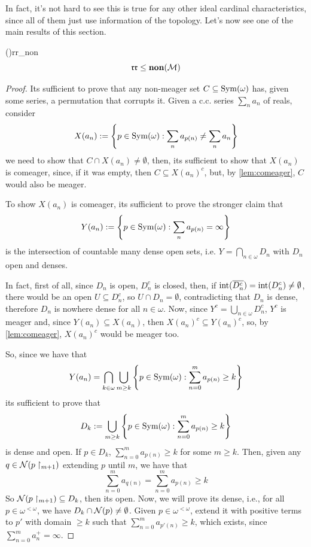 In fact, it's not hard to see this is true for any other ideal cardinal characteristics, since all of them just use information of the topology. Let's now see one of the main results of this section.

\begin{theorem}{(\cite{blass})}{rr_non}
    $$\mathfrak{rr}\leq\textbf{non}(\mathcal{M})$$
\end{theorem}

\begin{proof}
    Its sufficient to prove that any non-meager set $C\subseteq\mathrm{Sym}(\omega)$ has, given some series, a permutation that corrupts it. Given a c.c. series $\sum_n a_n$ of reals, consider
    $$X(a_n):=\left\{p\in\mathrm{Sym}(\omega):\sum_n a_{p(n)}\neq\sum_n a_n\right\}$$
    we need to show that $C\cap X(a_n)\neq\emptyset$, then, its sufficient to show that $X(a_n)$ is comeager, since, if it was empty, then $C\subseteq X(a_n)^c$, but, by \cref{lem:comeager}, $C$ would also be meager.

    To show $X(a_n)$ is comeager, its sufficient to prove the stronger claim that
    $$Y(a_n):=\left\{p\in\mathrm{Sym}(\omega):\sum_n a_{p(n)}=\infty\right\}$$
    is the intersection of countable many dense open sets, i.e. $Y=\bigcap_{n\in\omega}D_n$ with $D_n$ open and denses.
    
    In fact, first of all, since $D_n$ is open, $D_n^c$ is closed, then, if $\text{int}(\overline{D_n^c})=\text{int}(D_n^c)\neq\emptyset$, there would be an open $U\subseteq D_n^c$, so $U\cap D_n=\emptyset$, contradicting that $D_n$ is dense, therefore $D_n$ is nowhere dense for all $n\in\omega$. Now, since $Y^c=\bigcup_{n\in\omega}D_n^c$, $Y^c$ is meager and, since $Y(a_n)\subseteq X(a_n)$, then $X(a_n)^c\subseteq Y(a_n)^c$, so, by \cref{lem:comeager}, $X(a_n)^c$ would be meager too.

    So, since we have that
    $$Y(a_n)=\bigcap_{k\in\omega}\bigcup_{m\geq k}\left\{p\in\mathrm{Sym}(\omega):\sum_{n=0}^m a_{p(n)}\geq k\right\}$$
    its sufficient to prove that
    $$D_k:=\bigcup_{m\geq k}\left\{p\in\mathrm{Sym}(\omega):\sum_{n=0}^m a_{p(n)}\geq k\right\}$$
    is dense and open. If $p\in D_k$, $\sum_{n=0}^m a_{p(n)}\geq k$ for some $m\geq k$. Then, given any $q\in\mathcal{N}(p\restriction_{m+1})$ extending $p$ until $m$, we have that
    $$\sum_{n=0}^m a_{q(n)}=\sum_{n=0}^m a_{p(n)}\geq k$$
    So $\mathcal{N}(p\restriction_{m+1})\subseteq D_k$, then its open. Now, we will prove its dense, i.e., for all $p\in\omega^{<\omega}$, we have $D_k\cap \mathcal{N}(p)\neq\emptyset$. Given $p\in\omega^{<\omega}$, extend it with positive terms to $p'$ with domain $\geq k$ such that $\sum_{n=0}^m a_{p'(n)}\geq k$, which exists, since $\sum_{n=0}^m a_n^+=\infty$.
\end{proof}

